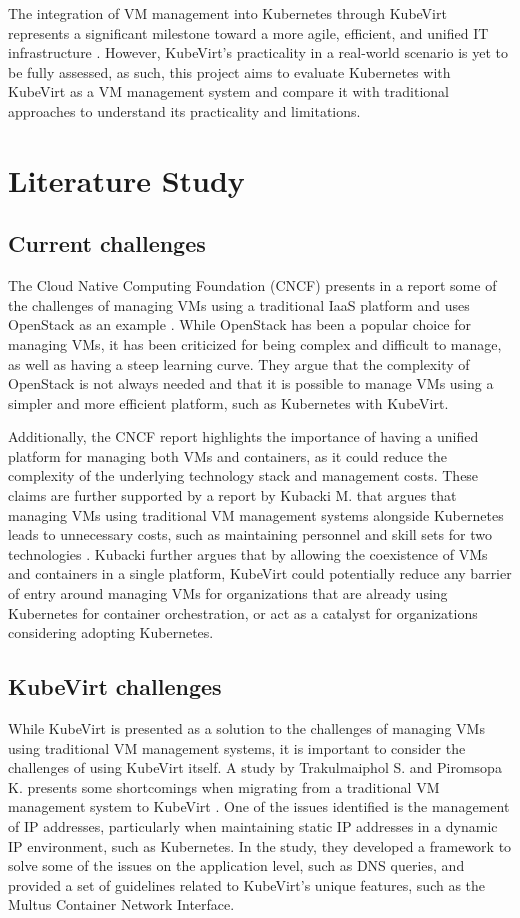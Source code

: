 \documentclass{article}
\begin{document}
The integration of VM management into Kubernetes through KubeVirt represents a significant milestone toward a more agile, efficient, and unified IT infrastructure \cite{kubevirt-storware}. However, KubeVirt's practicality in a real-world scenario is yet to be fully assessed, as such, this project aims to evaluate Kubernetes with KubeVirt as a VM management system and compare it with traditional approaches to understand its practicality and limitations.


\newpage
\section{Literature Study}
\label{literature-study}
\subsection{Current challenges}
The Cloud Native Computing Foundation (CNCF) presents in a report some of the challenges of managing VMs using a traditional IaaS platform and uses OpenStack as an example \cite{kubevirt-cncf}. While OpenStack has been a popular choice for managing VMs, it has been criticized for being complex and difficult to manage, as well as having a steep learning curve. They argue that the complexity of OpenStack is not always needed and that it is possible to manage VMs using a simpler and more efficient platform, such as Kubernetes with KubeVirt. 

Additionally, the CNCF report highlights the importance of having a unified platform for managing both VMs and containers, as it could reduce the complexity of the underlying technology stack and management costs. These claims are further supported by a report by Kubacki M. that argues that managing VMs using traditional VM management systems alongside Kubernetes leads to unnecessary costs, such as maintaining personnel and skill sets for two technologies \cite{kubevirt-storware}. Kubacki further argues that by allowing the coexistence of VMs and containers in a single platform, KubeVirt could potentially reduce any barrier of entry around managing VMs for organizations that are already using Kubernetes for container orchestration, or act as a catalyst for organizations considering adopting Kubernetes. 

\subsection{KubeVirt challenges}
While KubeVirt is presented as a solution to the challenges of managing VMs using traditional VM management systems, it is important to consider the challenges of using KubeVirt itself. A study by Trakulmaiphol S. and Piromsopa K. presents some shortcomings when migrating from a traditional VM management system to KubeVirt \cite{kubevirt-migrate-issues}. One of the issues identified is the management of IP addresses, particularly when maintaining static IP addresses in a dynamic IP environment, such as Kubernetes. In the study, they developed a framework to solve some of the issues on the application level, such as DNS queries, and provided a set of guidelines related to KubeVirt's unique features, such as the Multus Container Network Interface. 
\end{document}
